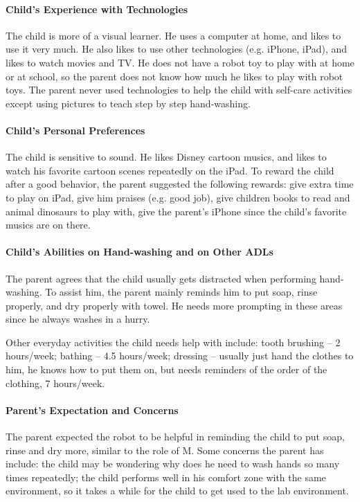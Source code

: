 \paragraph{Child's Experience with Technologies}
The child is more of a visual learner.  He uses a computer at home, and likes to use it very much.  He also likes to use other technologies (e.g. iPhone, iPad), and likes to watch movies and TV.  He does not have a robot toy to play with at home or at school, so the parent does not know how much he likes to play with robot toys.  The parent never used technologies to help the child with self-care activities except using pictures to teach step by step hand-washing.

\paragraph{Child's Personal Preferences}
The child is sensitive to sound.  He likes Disney cartoon musics, and likes to watch his favorite cartoon scenes repeatedly on the iPad.  To reward the child after a good behavior, the parent suggested the following rewards: give extra time to play on iPad, give him praises (e.g. good job), give children books to read and animal dinosaurs to play with, give the parent's iPhone since the child's favorite musics are on there.

\paragraph{Child's Abilities on Hand-washing and on Other ADLs}
The parent agrees that the child usually gets distracted when performing hand-washing.  To assist him, the parent mainly reminds him to put soap, rinse properly, and dry properly with towel.  He needs more prompting in these areas since he always washes in a hurry.

Other everyday activities the child needs help with include:  tooth brushing -- 2 hours/week; bathing -- 4.5 hours/week; dressing -- usually just hand the clothes to him, he knows how to put them on, but needs reminders of the order of the clothing, 7 hours/week.

\paragraph{Parent's Expectation and Concerns}
The parent expected the robot to be helpful in reminding the child to put soap, rinse and dry more, similar to the role of M.  Some concerns the parent has include: the child may be wondering why does he need to wash hands so many times repeatedly; the child performs well in his comfort zone with the same environment, so it takes a while for the child to get used to the lab environment.

